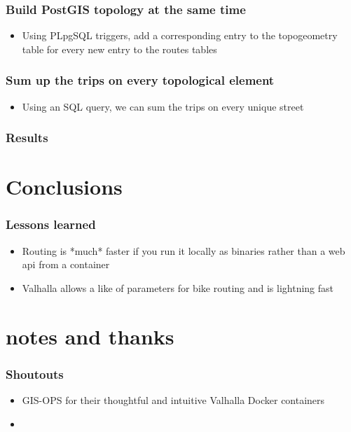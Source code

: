 \documentclass{beamer}
\begin{document}
\begin{frame}
    \frametitle{Build PostGIS topology at the same time}
    \begin{itemize}
        \item Using PLpgSQL triggers, add a corresponding entry to the topogeometry table for every new entry to the routes tables
    \end{itemize}
\end{frame}

\begin{frame}
    \frametitle{Sum up the trips on every topological element}
    \begin{itemize}
        \item Using an SQL query, we can sum the trips on every unique street
    \end{itemize}
\end{frame}

\begin{frame}
    \frametitle{Results}
    
\end{frame}

\section{Conclusions}

\begin{frame}
    \frametitle{Lessons learned}
    
    \begin{itemize}
        \item Routing is *much* faster if you run it locally as binaries rather than a web api from a container
        \item Valhalla allows a like of parameters for bike routing and is lightning fast
    \end{itemize}
\end{frame}

\section{notes and thanks}

\begin{frame}
    \frametitle{Shoutouts}
    \begin{itemize}
        \item GIS-OPS for their thoughtful and intuitive Valhalla Docker containers
        \item
    \end{itemize}
\end{frame}
\end{document}
